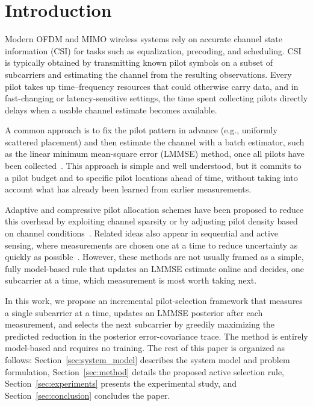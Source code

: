 \section{Introduction}
\label{sec:intro}

Modern OFDM and MIMO wireless systems rely on accurate channel state information (CSI) for tasks such as equalization, precoding, and scheduling. CSI is typically obtained by transmitting known pilot symbols on a subset of subcarriers and estimating the channel from the resulting observations. Every pilot takes up time--frequency resources that could otherwise carry data, and in fast-changing or latency-sensitive settings, the time spent collecting pilots directly delays when a usable channel estimate becomes available.

A common approach is to fix the pilot pattern in advance (e.g., uniformly scattered placement) and then estimate the channel with a batch estimator, such as the linear minimum mean-square error (LMMSE) method, once all pilots have been collected~\cite{yu2025lmmse}. This approach is simple and well understood, but it commits to a pilot budget and to specific pilot locations ahead of time, without taking into account what has already been learned from earlier measurements.

Adaptive and compressive pilot allocation schemes have been proposed to reduce this overhead by exploiting channel sparsity or by adjusting pilot density based on channel conditions~\cite{arai2025joint}. Related ideas also appear in sequential and active sensing, where measurements are chosen one at a time to reduce uncertainty as quickly as possible~\cite{sohrabi2021active}. However, these methods are not usually framed as a simple, fully model-based rule that updates an LMMSE estimate online and decides, one subcarrier at a time, which measurement is most worth taking next.

In this work, we propose an incremental pilot-selection framework that measures a single subcarrier at a time, updates an LMMSE posterior after each measurement, and selects the next subcarrier by greedily maximizing the predicted reduction in the posterior error-covariance trace. The method is entirely model-based and requires no training. The rest of this paper is organized as follows: Section~\ref{sec:system_model} describes the system model and problem formulation, Section~\ref{sec:method} details the proposed active selection rule, Section~\ref{sec:experiments} presents the experimental study, and Section~\ref{sec:conclusion} concludes the paper.
